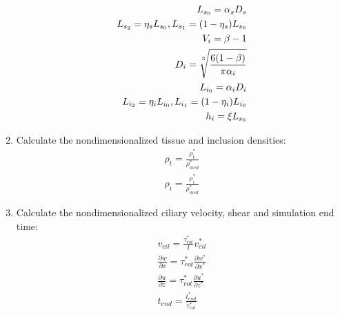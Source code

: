 \documentclass[10pt,a4paper]{article}
\def\non{\nonumber}
\def\p{\partial}
\def\l{\mathit{l}}
\begin{document}
\begin{enumerate}
\begin{eqnarray}
		L_{s_0} = \alpha_s D_s \non \\
		L_{s_2} = \eta_s L_{s_0}, L_{s_1} = (1 - \eta_s) L_{s_0} \non \\
		V_i = \beta - 1 \non \\
		D_i = \sqrt[\uproot{5}3]{\frac{6 (1-\beta)}{\pi \alpha_i}} \non \\
		L_{i_0} = \alpha_i D_i \non \\
		L_{i_2} = \eta_i L_{i_0}, L_{i_1} = (1 - \eta_i) L_{i_0} \non \\
		h_i = \xi L_{s_0} 
	\end{eqnarray}
	\item Calculate the nondimensionalized tissue and inclusion densities:
	\begin{eqnarray}\label{d2ndpars5}
		\rho_t = \frac{\rho_t^*}{\rho_{med}^*} \non \\
		\rho_i = \frac{\rho_i^*}{\rho_{med}^*}
	\end{eqnarray}
	\item Calculate the nondimensionalized ciliary velocity, shear and simulation end time:
	\begin{eqnarray}\label{d2ndpars6}
		v_{cil} = \frac{{\tau^*_{rot}}}{\l}  v^*_{cil} \non \\
		\frac{\p w}{\p x} = \tau^*_{rot} \frac{\p w^*}{\p x^*} \non \\
		\frac{\p u}{\p z} = \tau^*_{rot} \frac{\p u^*}{\p z^*} \non \\
		t_{end} = \frac{t^*_{end}}{\tau^*_{rot}}
	\end{eqnarray}
\end{enumerate}

\newpage 
\end{document}
